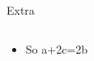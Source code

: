 \documentclass[
    xcolor={svgnames},
    hyperref={colorlinks,citecolor=OrangeRed,linkcolor=OrangeRed,urlcolor=DarkBlue}
    ]{beamer}
\begin{document}
\begin{frame}{Extra}
{\begin{columns}
\begin{column}{0.6\textwidth}
\begin{itemize}
                    \item So a+2c=2b
                \end{itemize}
            \end{column}
        \end{columns}
    }
    

\end{frame}
\end{document}
